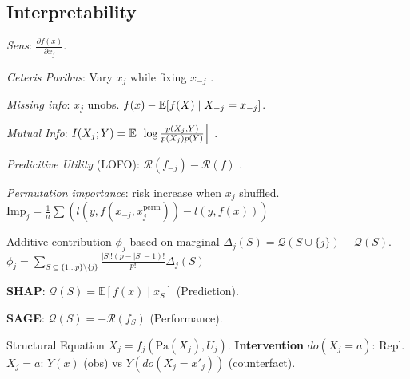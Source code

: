 \subsection{Interpretability}

\begin{definition}[Local]
    \begin{itemize*}
        \item \textit{Sens}: \(\frac{\partial f(x)}{\partial x_j}\). 
        \item \textit{Ceteris Paribus}: Vary \(x_j\) while fixing \(x_{-j}\) .
        \item \textit{Missing info}: \(x_j\) unobs. \(f(x) - \mathbb{E}[f(X) \mid X_{-j} = x_{-j}]\).
    \end{itemize*}

\end{definition}

\begin{definition}[Global]
    \begin{itemize*}
        \item \textit{Mutual Info}: \(I(X_j ; Y) = \mathbb{E}\left[\log\frac{p(X_j, Y)}{p(X_j)p(Y)}\right]\) .
        \item \textit{Predicitive Utility} (LOFO): \(\mathcal{R}(f_{-j}) - \mathcal{R}(f)\) .
        \item \textit{Permutation importance}: risk increase when \(x_j\) shuffled.
        \(\text{Imp}_j = \frac{1}{n} \sum \left( l(y, f(x_{-j}, x_j^{\text{perm}})) - l(y, f(x)) \right)\)
    \end{itemize*}
\end{definition}

\begin{definition}
    Additive contribution \(\phi_j\) based on marginal \(\Delta_j(S) = \mathcal{Q}(S \cup \{j\}) - \mathcal{Q}(S)\).
    \( \phi_j = \sum_{S \subseteq \{1 \dots p\} \setminus \{j\}} \frac{|S|! (p - |S| - 1)!}{p!} \Delta_j(S) \)
    \begin{itemize*}
        \item \textbf{SHAP}: \(\mathcal{Q}(S) = \mathbb{E}[f(x) \mid x_S]\) (Prediction).
        \item \textbf{SAGE}: \(\mathcal{Q}(S) = -\mathcal{R}(f_S)\) (Performance).
    \end{itemize*}
\end{definition}

\begin{definition}
    Structural Equation \(X_j = f_j(\text{Pa}(X_j), U_j)\).
    \textbf{Intervention} \(do(X_j = a)\): Repl. \(X_j = a\): \(Y(x)\) (obs) vs \(Y(do(X_j = x'_j))\) (counterfact).
\end{definition}

